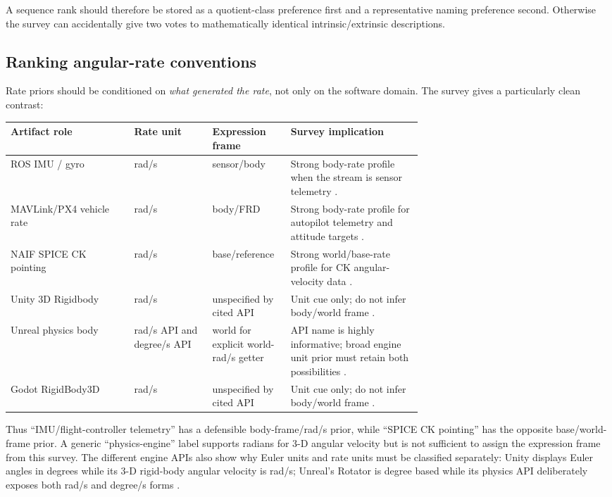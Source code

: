 \documentclass[11pt]{article}
\begin{document}
    A sequence rank should therefore be stored as a quotient-class preference first and a
    representative naming preference second. Otherwise the survey can accidentally give
    two votes to mathematically identical intrinsic/extrinsic descriptions.

    \subsection{Ranking angular-rate conventions}

    Rate priors should be conditioned on \emph{what generated the rate}, not only on the
    software domain. The survey gives a particularly clean contrast:
    \begin{center}
        \small
        \begin{tabularx}{\linewidth}{@{}p{0.30\linewidth}p{0.19\linewidth}p{0.19\linewidth}Y@{}}
\toprule
Artifact role & Rate unit & Expression frame & Survey implication \\
\midrule
ROS IMU / gyro & rad/s & sensor/body & Strong body-rate profile when the stream is sensor telemetry \cite{rosrep145}. \\
MAVLink/PX4 vehicle rate & rad/s & body/FRD & Strong body-rate profile for autopilot telemetry and attitude targets \cite{mavlinkCommon,px4VehicleOdometry}. \\
NAIF SPICE CK pointing & rad/s & base/reference & Strong world/base-rate profile for CK angular-velocity data \cite{naifCK}. \\
Unity 3D Rigidbody & rad/s & unspecified by cited API & Unit cue only; do not infer body/world frame \cite{unityAngularVelocity}. \\
Unreal physics body & rad/s API and degree/s API & world for explicit world-rad/s getter & API name is highly informative; broad engine unit prior must retain both possibilities \cite{unrealAngularVelocity,unrealAngularDegrees}. \\
Godot RigidBody3D & rad/s & unspecified by cited API & Unit cue only; do not infer body/world frame \cite{godotAngularVelocity}. \\
\bottomrule
        \end{tabularx}
    \end{center}

    Thus ``IMU/flight-controller telemetry'' has a defensible body-frame/rad/s prior, while
    ``SPICE CK pointing'' has the opposite base/world-frame prior. A generic
    ``physics-engine'' label supports radians for 3-D angular velocity but is not sufficient
    to assign the expression frame from this survey. The different engine APIs also show
    why Euler units and rate units must be classified separately: Unity displays Euler
    angles in degrees while its 3-D rigid-body angular velocity is rad/s; Unreal's Rotator
    is degree based while its physics API deliberately exposes both rad/s and degree/s
    forms \cite{unityEuler,unityAngularVelocity,unrealRotator,unrealAngularVelocity,unrealAngularDegrees}.
\end{document}
